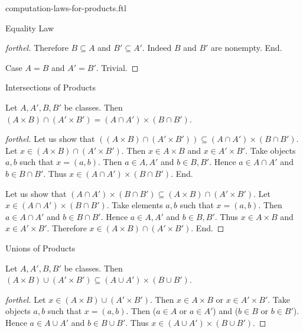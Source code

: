 \documentclass{naproche-library}
\begin{document}
\begin{smodule}[title=Computation Laws for Cartesian Products]{computation-laws-for-products.ftl}
\begin{sfragment}{Equality Law}
\begin{proof}[forthel]
      Therefore $B \subseteq A$ and $B' \subseteq A'$.
      Indeed $B$ and $B'$ are nonempty.
    End.

    Case $A = B$ and $A' = B'$. Trivial.
  \end{proof}
\end{sfragment}

\begin{sfragment}{Intersections of Products}
  \begin{proposition}[forthel,id=FOUNDATIONS_05_4154592050806784]
    Let $A, A', B, B'$ be classes.
    Then $(A \times B) \cap (A' \times B') = (A \cap A') \times (B \cap B')$.
  \end{proposition}
  \begin{proof}[forthel]
    Let us show that $((A \times B) \cap (A' \times B')) \subseteq (A \cap A') \times (B \cap B')$. %
      Let $x \in (A \times B) \cap (A' \times B')$.
      Then $x \in A \times B$ and $x \in A' \times B'$.
      Take objects $a, b$ such that $x = (a, b)$.
      Then $a \in A, A'$ and $b \in B, B'$.
      Hence $a \in A \cap A'$ and $b \in B \cap B'$.
      Thus $x \in (A \cap A') \times (B \cap B')$.
    End.

    Let us show that $(A \cap A') \times (B \cap B') \subseteq (A \times B) \cap (A' \times B')$.
      Let $x \in (A \cap A') \times (B \cap B')$.
      Take elements $a, b$ such that $x = (a, b)$.
      Then $a \in A \cap A'$ and $b \in B \cap B'$.
      Hence $a \in A, A'$ and $b \in B, B'$.
      Thus $x \in A \times B$ and $x \in A' \times B'$.
      Therefore $x \in (A \times B) \cap (A' \times B')$.
    End.
  \end{proof}
\end{sfragment}

\begin{sfragment}{Unions of Products}
  \begin{proposition}[forthel,id=FOUNDATIONS_05_7090174334861312]
    Let $A, A', B, B'$ be classes.
    Then $(A \times B) \cup (A' \times B') \subseteq (A \cup A') \times (B \cup B')$.
  \end{proposition}
  \begin{proof}[forthel]
    Let $x \in (A \times B) \cup (A' \times B')$.
    Then $x \in A \times B$ or $x \in A' \times B'$.
    Take objects $a, b$ such that $x = (a, b)$.
    Then ($a \in A$ or $a \in A'$) and ($b \in B$ or $b \in B'$).
    Hence $a \in A \cup A'$ and $b \in B \cup B'$.
    Thus $x \in (A \cup A') \times (B \cup B')$.
  \end{proof}
\end{sfragment}


\end{smodule}
\end{document}
